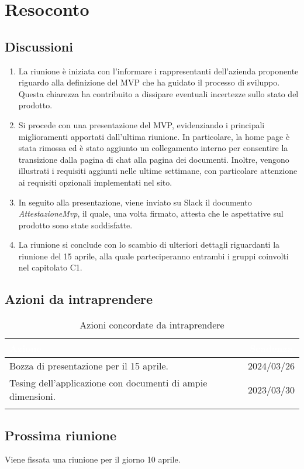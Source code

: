 \section{Resoconto} \label{sec:resoconto}
\subsection{Discussioni} \label{subsec:resdiscussione}
\begin{enumerate}
    \item La riunione è iniziata con l'informare i rappresentanti dell'azienda proponente riguardo alla definizione del MVP che ha guidato il processo di sviluppo. Questa chiarezza ha contribuito a dissipare eventuali incertezze sullo stato del prodotto.
    \item Si procede con una presentazione del MVP, evidenziando i principali miglioramenti apportati dall'ultima riunione. In particolare, la home page è stata rimossa ed è stato aggiunto un collegamento interno per consentire la transizione dalla pagina di chat alla pagina dei documenti. Inoltre, vengono illustrati i requisiti aggiunti nelle ultime settimane, con particolare attenzione ai requisiti opzionali implementati nel sito.
    \item In seguito alla presentazione, viene inviato su Slack il documento \textit{AttestazioneMvp}, il quale, una volta firmato, attesta che le aspettative sul prodotto sono state soddisfatte.
    \item La riunione si conclude con lo scambio di ulteriori dettagli riguardanti la riunione del 15 aprile, alla quale parteciperanno entrambi i gruppi coinvolti nel capitolato C1.
\end{enumerate}


\subsection{Azioni da intraprendere} \label{subsec:action}

{
\setlength{\tabcolsep}{10pt}
\renewcommand{\arraystretch}{1.5}
\begin{xltabular}{\textwidth}{| X | c |}
    \hline
     \textbf{\textcolor{white}{Azione}} & \textbf{\textcolor{white}{Scadenza}} \\
    \hline
    \endhead
    Bozza di presentazione per il 15 aprile.  & 2024/03/26\\
    \hline
    Tesing dell'applicazione con documenti di ampie dimensioni.  & 2023/03/30 \\
    \hline
    
     \caption{Azioni concordate da intraprendere}
    \label{tab:reqimp}
\end{xltabular}
}


\subsection{Prossima riunione} \label{subsec:riunione}
Viene fissata una riunione per il giorno 10 aprile.


